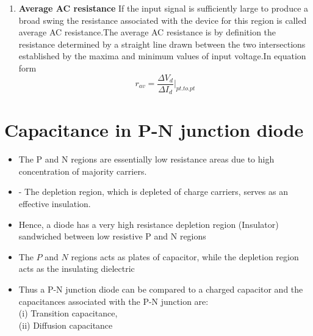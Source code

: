 \begin{enumerate}
\begin{equation}
r_{d}=\frac{\Delta V_{d}}{\Delta I_{d}}
\end{equation}
Where $\Delta$ signifies a finite change in the quantity. The steeper the slope, the lower is the value of $\Delta V_{d}$ for the same change in $\Delta I_{d}$ and the lower is the resistance. The ac resistance in the vertical-rise region of the characteristic is therefore quite small, whereas the ac resistance is much higher at low current levels.
In general, therefore, the lower the $Q$-point of operation (smaller current or lower voltage), the higher is the ac resistance.\\
We have found the dynamic resistance graphically, but there is a basic definition in differential calculus that states:
The derivative of a function at a point is equal to the slope of the tangent line drawn
at that point.
\begin{align*}
\frac{d}{d V_{D}}\left(I_{D}\right)&=\frac{d}{d V}\left[I_{S}\left(e^{k V_{D} / T_{K}}-1\right)\right]\\
\text{And } \ \frac{d I_{D}}{d V_{D}}&=\frac{k}{T_{K}}\left(I_{D}+I_{s}\right)
\intertext{After we apply differential calculus. In general, $I_{D} \gg I_{s}$ in the vertical-slope section of the characteristics ,}
\frac{d I_{D}}{d V_{D}} &\cong \frac{k}{T_{K}} I_{D}
\intertext{Flipping the result to define a resistance ratio $(R=V / I)$ gives,}
\frac{d V_{D}}{d I_{D}}&=r_{d}=\frac{ T_{K}}{kI_{D}}
\end{align*}
\item \textbf{Average AC resistance}
If the input signal is sufficiently large to produce a broad swing the resistance associated with the device for this region is called average AC resistance.The average AC resistance is by definition the resistance determined by a straight line drawn between the two intersections established by the maxima and minimum values of input voltage.In equation form 
$$r_{av}=\frac{\Delta V_d}{\Delta I_d}|_{pt.to.pt}$$
\end{enumerate}
\section{Capacitance in P-N junction diode}
\begin{itemize}
\item  The P and N regions are essentially low resistance areas due to high concentration of majority carriers.
\item - The depletion region, which is depleted of charge carriers, serves as an effective insulation.
\item  Hence, a diode has a very high resistance depletion region (Insulator) sandwiched between low resistive P and N regions
\item  The $P$ and $N$ regions acts as plates of capacitor, while the depletion region acts as the insulating dielectric
\item  Thus a P-N junction diode can be compared to a charged capacitor and the capacitances associated with the P-N junction are:\\
(i) Transition capacitance,\\
(ii) Diffusion capacitance
\end{itemize}
